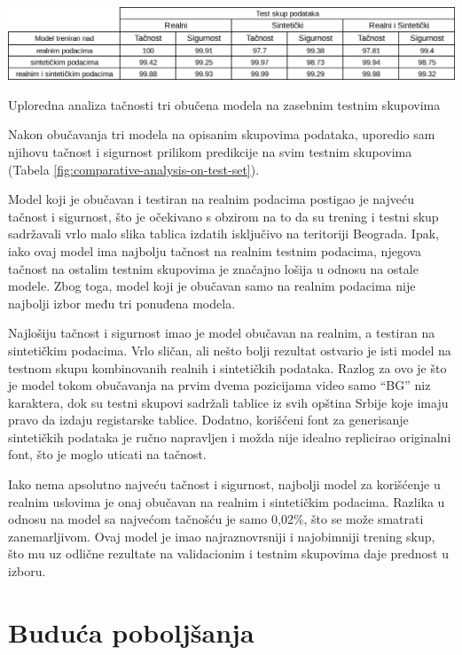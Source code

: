 \documentclass[a4paper,12pt]{article}
\begin{document}
	\begin{table}[H]
		\centering
		\includegraphics[width=\textwidth]{assets/comparative-analysis-on-test-set.png}
		\caption{Uploredna analiza tačnosti tri obučena modela na zasebnim testnim skupovima}
		\label{fig:comparative-analysis-on-test-set}
	\end{table}

	Nakon obučavanja tri modela na opisanim skupovima podataka, uporedio sam njihovu tačnost i sigurnost prilikom predikcije na svim testnim skupovima (Tabela \ref{fig:comparative-analysis-on-test-set}).
	
	Model koji je obučavan i testiran na realnim podacima postigao je najveću tačnost i sigurnost, što je očekivano s obzirom na to da su trening i testni skup sadržavali vrlo malo slika tablica izdatih isključivo na teritoriji Beograda. Ipak, iako ovaj model ima najbolju tačnost na realnim testnim podacima, njegova tačnost na ostalim testnim skupovima je značajno lošija u odnosu na ostale modele. Zbog toga, model koji je obučavan samo na realnim podacima nije najbolji izbor među tri ponuđena modela.
	
	Najlošiju tačnost i sigurnost imao je model obučavan na realnim, a testiran na sintetičkim podacima. Vrlo sličan, ali nešto bolji rezultat ostvario je isti model na testnom skupu kombinovanih realnih i sintetičkih podataka. Razlog za ovo je što je model tokom obučavanja na prvim dvema pozicijama video samo \enquote{BG} niz karaktera, dok su testni skupovi sadržali tablice iz svih opština Srbije koje imaju pravo da izdaju registarske tablice. Dodatno, korišćeni font za generisanje sintetičkih podataka je ručno napravljen i možda nije idealno replicirao originalni font, što je moglo uticati na tačnost.
	
	Iako nema apsolutno najveću tačnost i sigurnost, najbolji model za korišćenje u realnim uslovima je onaj obučavan na realnim i sintetičkim podacima. Razlika u odnosu na model sa najvećom tačnošću je samo 0,02\%, što se može smatrati zanemarljivom. Ovaj model je imao najraznovrsniji i najobimniji trening skup, što mu uz odlične rezultate na validacionim i testnim skupovima daje prednost u izboru.
	\newpage
	
	\section{Buduća poboljšanja}
	
\end{document}
